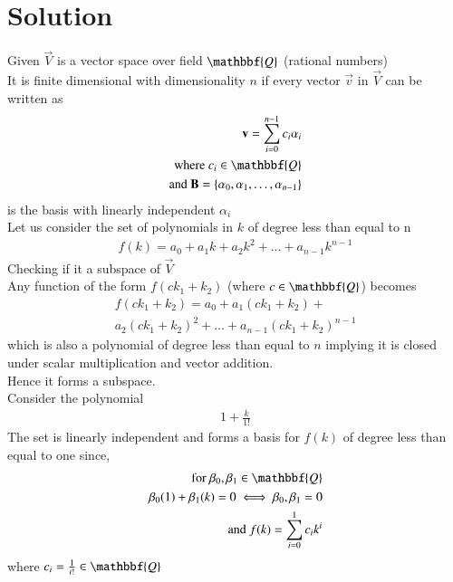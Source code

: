 \documentclass[journal,12pt,twocolumn]{IEEEtran}
\begin{document}
\section{Solution}
Given $\vec{V}$ is a vector space over field $\mathbbf{Q}$ (rational numbers)\\
It is finite dimensional with dimensionality $n$ if every vector $\vec{v}$ in $\vec{V}$ can be written as
\begin{align}
    \vec{v}=\sum_{i=0}^{n-1} c_i\alpha_i\\
    \text{where }c_i \in \mathbbf{Q}\\
    \text{and } \vec{B}= \cbrak{\alpha_0,\alpha_1,\hdots,\alpha_{n-1} }
\end{align}
is the basis with linearly independent $\alpha_i$\\
Let us consider the set of polynomials in $k$ of degree less than equal to n
\begin{align}
    f(k)=a_0+a_1k+a_2k^2+\hdots+a_{n-1}k^{n-1}
\end{align}
Checking if it a subspace of $\vec{V}$\\
Any function of the form $f(ck_1+k_2)$ (where $c \in \mathbbf{Q}$) becomes
\begin{align}
   f(ck_1+k_2)=a_0+a_1(ck_1+k_2)+\\a_2(ck_1+k_2)^2+\hdots+a_{n-1}(ck_1+k_2)^{n-1} 
\end{align}
which is also a polynomial of degree less than equal to $n$ implying it is closed under scalar multiplication and vector addition.\\
Hence it forms a subspace.\\
Consider the polynomial 
\begin{align}
1+\frac{k}{1!}
\end{align}
The set  is linearly independent and forms a basis for $f(k)$ of degree less than equal to one since,
\begin{align}
\text{for  } \beta_0,\beta_1 \in \mathbbf{Q}\\
    \beta_0(1)+\beta_1(k)=0 \iff  \beta_0, \beta_1=0\\
    \text{and  }f(k)=\sum_{i=0}^1 c_i k^i
\end{align}
 where $c_i = \frac{1}{i!} \in \mathbbf{Q}$
\end{document}
